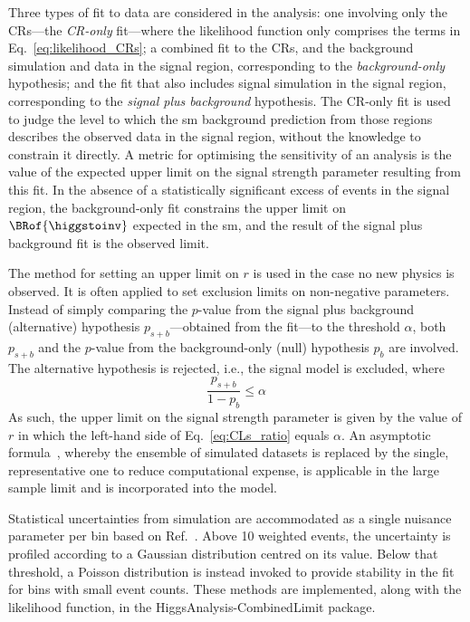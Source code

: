 Three types of fit to data are considered in the analysis: one involving only the \glspl{CR}---the \emph{\gls{CR}-only} fit---where the likelihood function only comprises the terms in Eq.~\ref{eq:likelihood_CRs}; a combined fit to the \glspl{CR}, and the background simulation and data in the signal region, corresponding to the \emph{background-only} hypothesis; and the fit that also includes signal simulation in the signal region, corresponding to the \emph{signal plus background} hypothesis. The \gls{CR}-only fit is used to judge the level to which the \acrshort{sm} background prediction from those regions describes the observed data in the signal region, without the knowledge to constrain it directly. A metric for optimising the sensitivity of an analysis is the value of the expected upper limit on the signal strength parameter resulting from this fit. In the absence of a statistically significant excess of events in the signal region, the background-only fit constrains the upper limit on $\BRof{\higgstoinv}$ expected in the \acrshort{sm}, and the result of the signal plus background fit is the observed limit.

The \CLs method for setting an upper limit on $r$ is used in the case no new physics is observed. It is often applied to set exclusion limits on non-negative parameters. Instead of simply comparing the $p$-value from the signal plus background (alternative) hypothesis $p_{s+b}$---obtained from the fit---to the threshold $\alpha$, both $p_{s+b}$ and the $p$-value from the background-only (null) hypothesis $p_b$ are involved. The alternative hypothesis is rejected, i.e., the signal model is excluded, where
\begin{equation}
    \frac{p_{s+b}}{1 - p_b} \leq \alpha
    \label{eq:CLs_ratio}
\end{equation}
As such, the upper limit on the signal strength parameter is given by the value of $r$ in which the left-hand side of Eq.~\ref{eq:CLs_ratio} equals $\alpha$. An asymptotic formula~\cite{Cowan:2010js}, whereby the ensemble of simulated datasets is replaced by the single, representative one to reduce computational expense, is applicable in the large sample limit and is incorporated into the model.

Statistical uncertainties from simulation are accommodated as a single nuisance parameter per bin based on Ref.~. Above 10 weighted events, the uncertainty is profiled according to a Gaussian distribution centred on its value. Below that threshold, a Poisson distribution is instead invoked to provide stability in the fit for bins with small event counts. These methods are implemented, along with the likelihood function, in the \textsf{HiggsAnalysis-CombinedLimit} package.

